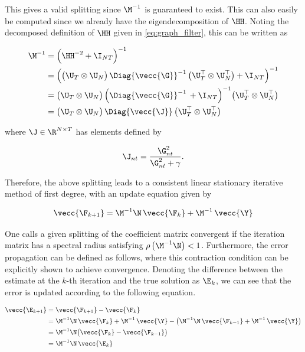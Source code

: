 This gives a valid splitting since $\M^{-1}$ is guaranteed to exist. This can also easily be computed since we already have the eigendecomposition of $\HH$. Noting the decomposed definition of $\HH$ given in \cref{eq:graph_filter}, this can be written as 

\begin{align}
\label{eq:inv}
\M^{-1} &= \Big( \HH^{-2} + \I_{NT}\Big)^{-1} \notag \\
 &= \Big( \big(\U_T \otimes \U_N\big)\, \Diag{\vecc{\G}}^{-1}\,  \big(\U_T^\top \otimes \U_N^\top\big)  + \I_{NT} \Big)^{-1} \notag \\
 &= \big(\U_T \otimes \U_N\big)\, \Big(  \Diag{\vecc{\G}}^{-1}\,    + \I_{NT} \Big)^{-1} \big(\U_T^\top \otimes \U_N^\top\big) \notag \\
&= \big(\U_T \otimes \U_N\big)\, \Diag{\vecc{\J}}\,  \big(\U_T^\top \otimes \U_N^\top\big) 
\end{align}
 
\noindent where $\J \in \R^{N \times T}$ has elements defined by 

\begin{equation}
    \J_{nt} = \frac{\G_{nt}^2}{\G_{nt}^2 + \gamma}.
\end{equation}

Therefore, the above splitting leads to a consistent linear stationary iterative method of first degree, with an update equation given by
 
\begin{equation}
\label{eq:split_update}
\vecc{\F_{k+1}} = \M^{-1} \N \,  \vecc{\F_k} + \M^{-1} \, \vecc{\Y}
\end{equation}

One calls a given splitting of the coefficient matrix convergent if the iteration matrix has a spectral radius satisfying $\rho\left(\M^{-1}\N\right) < 1$. Furthermore, the error propagation can be defined as follows, where this contraction condition can be explicitly shown to achieve convergence. Denoting the difference between the estimate at the $k$-th iteration and the true solution as $\E_k$, we can see that the error is updated according to the following equation. 

\begin{align}
\label{eq:E}
\vecc{\E_{k+1}} &= \vecc{\F_{k+1}} - \vecc{\F_{k}} \notag \\
&= \M^{-1} \N \,  \vecc{\F_k} + \M^{-1} \, \vecc{\Y} - \big(\M^{-1} \N \,  \vecc{\F_{k-1}} + \M^{-1} \, \vecc{\Y} \big)\notag \\
&= \M^{-1} \N \big(\vecc{\F_k} - \vecc{\F_{k-1}} \big) \notag \\
&= \M^{-1} \N \,  \vecc{\E_k} 
\end{align}


